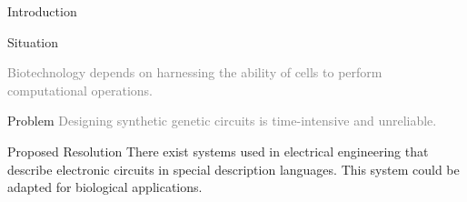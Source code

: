 \documentclass[10pt]{beamer}
\newcommand{\light}[1]{\textcolor{gray}{#1}}
\begin{document}
\begin{frame}[fragile]{Introduction}

    {
    
      \begin{block}{Situation}
      
        \light{Biotechnology depends on harnessing the ability of cells to perform computational operations. }
      \end{block}
      \begin{block}{Problem}
        \light{Designing synthetic genetic circuits is time-intensive and unreliable.}
      \end{block}
      \begin{exampleblock}{Proposed Resolution}
        There exist systems used in electrical engineering that describe electronic circuits in special description languages. This system could be adapted for biological applications.
      \end{exampleblock}}
      
\end{frame}

\begin{frame}{Technology}

\vspace{0.5cm}
\begin{figure}
    \centering
    }%
\end{figure}

\nocite{Brophy2014PrinciplesDesign} 
\end{frame}

\begin{frame}{Methods}

\vspace{0.5cm}
\begin{figure}
    \centering
    }%
\end{figure}

\nocite{Nielsen2016GeneticAutomation} 
\end{frame}
\end{document}
